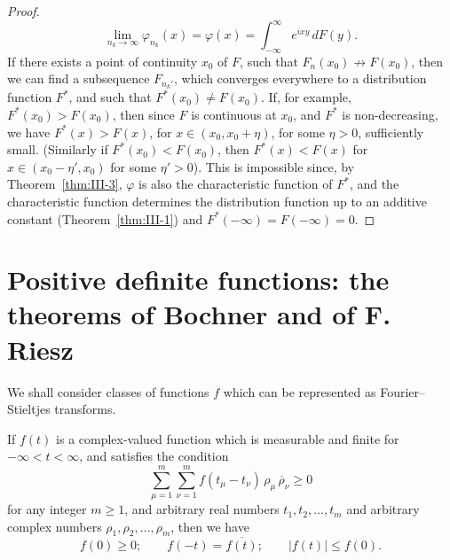 \begin{proof}
\[
\lim_{n_{k}\to\infty}\varphi_{n_{k}}(x)=\varphi(x)=\int_{-\infty}^{\infty}e^{ixy}\,dF(y).
\]
If there exists a point of continuity $x_{0}$ of $F$, such that $F_{n}(x_{0})\not\to F(x_{0})$, then we can find a subsequence $F_{n_{k}'}$, which converges everywhere to a distribution function $F^{*}$, and such that $F^{*}(x_{0})\neq F(x_{0})$. If, for example, $F^{*}(x_{0})>F(x_{0})$, then since $F$ is continuous at $x_{0}$, and $F^{*}$ is non-decreasing, we have $F^{*}(x)>F(x)$, for $x\in(x_{0},x_{0}+\eta)$, for some $\eta>0$, sufficiently small. (Similarly if $F^{*}(x_{0})<F(x_{0})$, then $F^{*}(x)<F(x)$ for $x\in(x_{0}-\eta',x_{0})$ for some $\eta'>0$). This is impossible since, by Theorem~\ref{thm:III-3}, $\varphi$ is also the characteristic function of $F^{*}$, and the characteristic function determines the distribution function up to an additive constant (Theorem~\ref{thm:III-1}) and $F^{*}(-\infty)=F(-\infty)=0$.
\end{proof}

\section{Positive definite functions: the theorems of Bochner and of F. Riesz}
\label{sec:III-3}

We shall consider classes of functions $f$ which can be represented as Fourier--Stieltjes transforms.

\begin{lemma}\label{lem:III-1}
If $f(t)$ is a complex-valued function which is measurable and finite for $-\infty<t<\infty$, and satisfies the condition
\begin{equation}\tag{3.1}\label{eq:III-3.1}
\sum_{\mu=1}^{m}\sum_{\nu=1}^{m}f(t_{\mu}-t_{\nu})\,\rho_{\mu}\,\overline{\rho}_{\nu}\ge0
\end{equation}
for any integer $m\ge1$, and arbitrary real numbers $t_{1},t_{2},\dots,t_{m}$ and arbitrary complex numbers $\rho_{1},\rho_{2},\dots,\rho_{m}$, then we have
\begin{equation}\tag{3.2}\label{eq:III-3.2}
f(0)\ge0;\qquad f(-t)=\overline{f(t)};\qquad |f(t)|\le f(0).
\end{equation}
\end{lemma}


